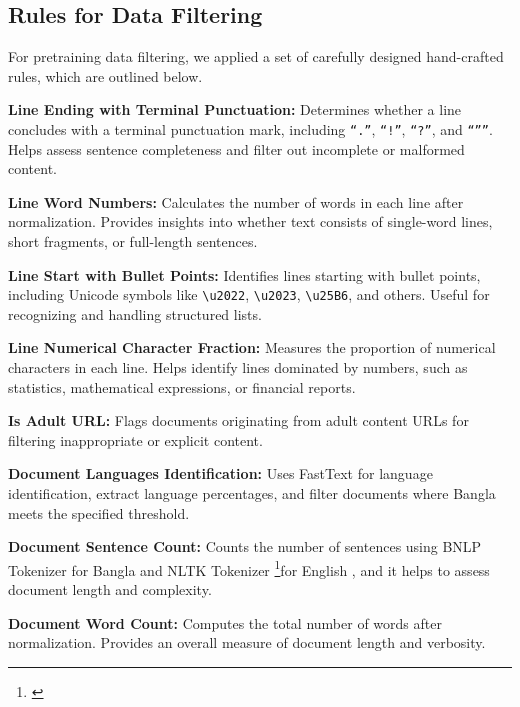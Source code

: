\subsection{Rules for Data Filtering}
\label{ssec:rule_data_filtering}

For pretraining data filtering, we applied a set of carefully designed hand-crafted rules, which are outlined below.

\noindent \textbf{Line Ending with Terminal Punctuation:}  
Determines whether a line concludes with a terminal punctuation mark, including \texttt{``.''}, \texttt{``!''}, \texttt{``?''}, and \texttt{``”''}. Helps assess sentence completeness and filter out incomplete or malformed content.

\noindent \textbf{Line Word Numbers:}  
Calculates the number of words in each line after normalization. Provides insights into whether text consists of single-word lines, short fragments, or full-length sentences.

\noindent \textbf{Line Start with Bullet Points:}  
Identifies lines starting with bullet points, including Unicode symbols like \texttt{\textbackslash u2022}, \texttt{\textbackslash u2023}, \texttt{\textbackslash u25B6}, and others. Useful for recognizing and handling structured lists.

\noindent \textbf{Line Numerical Character Fraction:}  
Measures the proportion of numerical characters in each line. Helps identify lines dominated by numbers, such as statistics, mathematical expressions, or financial reports.

\noindent \textbf{Is Adult URL:}  
Flags documents originating from adult content URLs for filtering inappropriate or explicit content.

\noindent \textbf{Document Languages Identification:} 
Uses FastText \cite{grave2018learning} for language identification, extract language percentages, and filter documents where Bangla meets the specified threshold.

\noindent \textbf{Document Sentence Count:}  
Counts the number of sentences using BNLP Tokenizer \cite{sarker2021bnlp}  for Bangla and NLTK Tokenizer \footnote{\url{}}for English , and it helps to assess document length and complexity.




\noindent \textbf{Document Word Count:}  
Computes the total number of words after normalization. Provides an overall measure of document length and verbosity.



